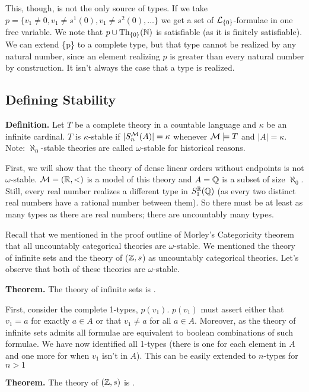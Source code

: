 This, though, is not the only source of types. 
If we take \(p = \{v_1 \neq 0, v_1 \neq s^1(0), v_1 \neq s^2(0), \ldots\}\) we get a set of \(\mathcal{L}_{\{0\}}\)-formulae in one free variable. 
We note that \(p \cup \text{Th}_{\{0\}}(\mathbb{N})\) is satisfiable (as it is finitely satisfiable). 
We can extend \{p\} to a complete type, but that type cannot be realized by any natural number, since an element realizing \(p\) is greater than every natural number by construction. 
It isn't always the case that a type is realized. 

\subsection{Defining Stability}

\textbf{Definition.} Let \(T\) be a complete theory in a countable language and \(\kappa\) be an infinite cardinal. 
\(T\) is \(\kappa\)-stable if \(|S_n^{\mathcal{M}}(A)| = \kappa\) whenever \(\mathcal{M} \models T\) and \(|A| = \kappa\). 
Note: \(\aleph_0\)-stable theories are called \(\omega\)-stable for historical reasons. 

First, we will show that the theory of dense linear orders without endpoints is not \(\omega\)-stable. 
\(\mathcal{M} = (\mathbb{R}, <)\) is a model of this theory and \(A = \mathbb{Q}\) is a subset of size \(\aleph_0\). 
Still, every real number realizes a different type in \(S_1^{\mathbb{R}}(\mathbb{Q})\) (as every two distinct real numbers have a rational number between them). 
So there must be at least as many types as there are real numbers; there are uncountably many types.  

Recall that we mentioned in the proof outline of Morley's Categoricity theorem that all uncountably categorical theories are \(\omega\)-stable. 
We mentioned the theory of infinite sets and the theory of (\(\mathbb{Z}, s\)) as uncountably categorical theories. 
Let's observe that both of these theories are \(\omega\)-stable. 

\textbf{Theorem.} The theory of infinite sets is \omst. 

First, consider the complete 1-types, \(p(v_1)\). \(p(v_1)\) must assert either that \(v_1 = a\) for exactly \(a \in A\) or that \(v_1 \neq a\) for all \(a \in A\). 
Moreover, as the theory of infinite sets admits \qe all formulae are equivalent to boolean combinations of such formulae. 
We have now identified all 1-types (there is one for each element in \(A\) and one more for when \(v_1\) isn't in \(A\)). 
This can be easily extended to \(n\)-types for \(n > 1\)

\textbf{Theorem.} The theory of \((\mathbb{Z}, s)\) is \omst. 

